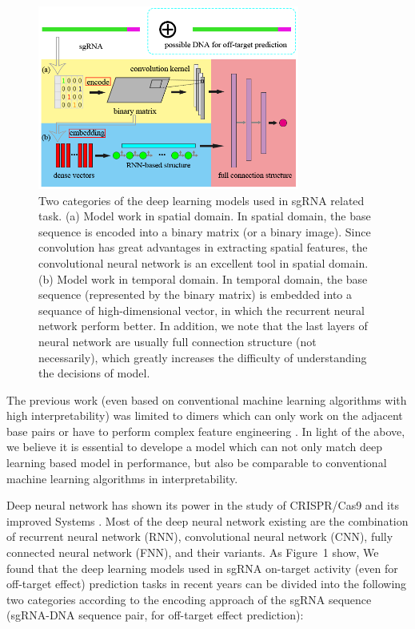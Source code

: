 \documentclass{bioinfo}
\begin{document}
\begin{figure}[!tpb]%
    \centerline{\includegraphics[width=86mm]{category.png}}
    \caption{Two categories of the deep learning models used in sgRNA related task. 
    (a) Model work in spatial domain. 
    In spatial domain, the base sequence is encoded into a binary matrix (or a binary image). 
    Since convolution has great advantages in extracting spatial features, the convolutional neural network is an excellent tool in spatial domain. 
    (b) Model work in temporal domain. 
    In temporal domain, the base sequence (represented by the binary matrix) is embedded into a sequance of high-dimensional vector, 
    in which the recurrent neural network perform better.
    In addition, we note that the last layers of neural network are usually full connection structure (not necessarily), 
    which greatly increases the difficulty of understanding the decisions of model.
    }\label{fig:01}
\end{figure}
 The previous work (even based on conventional machine learning algorithms with high interpretability) 
 was limited to dimers which can only work on the adjacent base pairs \citep{Liu2019} 
 or have to perform complex feature engineering \citep{MuhammadRafid2020}.
 In light of the above, we believe it is essential to develope a model which can not only match deep learning based model in performance, 
 but also be comparable to conventional machine learning algorithms in interpretability.

Deep neural network has shown its power in the study of CRISPR/Cas9 and its improved Systems \citep{liu2019computational}. 
 Most of the deep neural network existing are the combination of recurrent neural network (RNN), convolutional neural network (CNN), fully connected neural network (FNN), and their variants. 
 As Figure~1\vphantom{\ref{fig:01}} show,  
 We found that the deep learning models used in sgRNA on-target activity (even for off-target effect) prediction tasks in recent years can be divided into the following two categories according to the encoding approach of the sgRNA sequence (sgRNA-DNA sequence pair, for off-target effect prediction):
\end{document}
